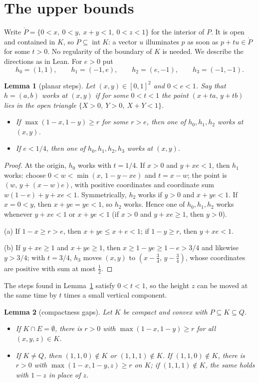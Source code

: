 \documentclass[11pt]{article}
\newtheorem{lemma}{Lemma}
\theoremstyle{definition}
\theoremstyle{remark}
\newcommand{\inter}{\operatorname{int}}
\begin{document}
\section{The upper bounds}\label{sec:upper}

Write $\mathring P=\{0<x,\ 0<y,\ x+y<1,\ 0<z<1\}$ for the interior of $P$. It
is open and contained in $K$, so $\mathring P\subseteq\inter K$: a vector $u$
illuminates $p$ as soon as $p+tu\in\mathring P$ for some $t>0$. No regularity
of the boundary of $K$ is needed. We describe the directions as in Lean. For
$e>0$ put
\[
h_0=(1,1),\qquad h_1=(-1,e),\qquad h_2=(e,-1),\qquad h_3=(-1,-1).
\]

\begin{lemma}[planar steps]\label{lem:planar}
Let $(x,y)\in[0,1]^2$ and $0<e<1$. Say that $h=(a,b)$ \emph{works} at $(x,y)$
if for some $0<t<1$ the point $(x+ta,\,y+tb)$ lies in the open triangle
$\{X>0,\ Y>0,\ X+Y<1\}$.
\begin{itemize}
\item[(a)] If $\max(1-x,1-y)\ge r$ for some $r>e$, then one of $h_0,h_1,h_2$
works at $(x,y)$.
\item[(b)] If $e<1/4$, then one of $h_0,h_1,h_2,h_3$ works at $(x,y)$.
\end{itemize}
\end{lemma}

\begin{proof}
At the origin, $h_0$ works with $t=1/4$. If $x>0$ and $y+xe<1$, then $h_1$
works: choose $0<w<\min(x,\,1-y-xe)$ and $t=x-w$; the point is
$(w,\,y+(x-w)e)$, with positive coordinates and coordinate sum
$w(1-e)+y+xe<1$. Symmetrically, $h_2$ works if $y>0$ and $x+ye<1$. If $x=0<y$,
then $x+ye=ye<1$, so $h_2$ works. Hence one of $h_0,h_1,h_2$ works whenever
$y+xe<1$ or $x+ye<1$ (if $x>0$ and $y+xe\ge1$, then $y>0$).

(a) If $1-x\ge r>e$, then $x+ye\le x+e<1$; if $1-y\ge r$, then $y+xe<1$.

(b) If $y+xe\ge1$ and $x+ye\ge1$, then $x\ge1-ye\ge1-e>3/4$ and likewise
$y>3/4$; with $t=3/4$, $h_3$ moves $(x,y)$ to $(x-\tfrac34,\,y-\tfrac34)$, whose
coordinates are positive with sum at most $\tfrac12$.
\end{proof}

\noindent The steps found in Lemma~\ref{lem:planar} satisfy $0<t<1$, so the
height $z$ can be moved at the same time by $t$ times a small vertical
component.

\begin{lemma}[compactness gaps]\label{lem:gaps}
Let $K$ be compact and convex with $P\subseteq K\subseteq Q$.
\begin{itemize}
\item[(a)] If $K\cap E=\emptyset$, there is $r>0$ with $\max(1-x,1-y)\ge r$ for
all $(x,y,z)\in K$.
\item[(b)] If $K\ne Q$, then $(1,1,0)\notin K$ or $(1,1,1)\notin K$. If
$(1,1,0)\notin K$, there is $r>0$ with $\max(1-x,1-y,z)\ge r$ on $K$; if
$(1,1,1)\notin K$, the same holds with $1-z$ in place of $z$.
\end{itemize}
\end{lemma}
\end{document}
